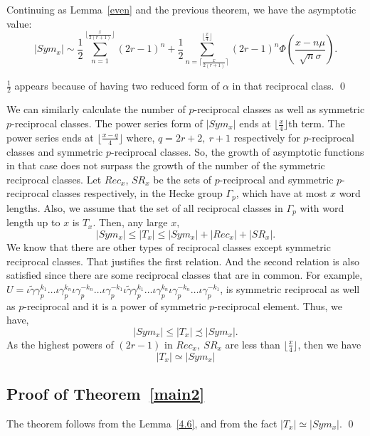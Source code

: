 \documentclass[11pt]{amsart}
\renewenvironment{proof}{{\bfseries Proof.}}{\qed}
\numberwithin{equation}{section}
\newcommand{\gt}{\tilde{\gamma}}
\newcommand{\g}{\gamma_{p}}
\newcommand{\io}{\iota }
\newcommand{\thmref}[1]{Theorem~\ref{#1}}
\newcommand{\lemref}[1]{Lemma~\ref{#1}}
\numberwithin{equation}{section}
\begin{document}
\begin{proof}
			Continuing as \lemref{even} and the previous theorem, we have the asymptotic value: 
				\[\left|Sym_{x}\right|\sim 	\frac{1}{2}\sum_{n=1}^{\lfloor \frac{x}{2(r+1)}\rfloor}(2r-1)^{n}+\frac{1}{2}{\sum_{n=\lceil \frac{x}{2(r+1)}\rceil}^{\lfloor\frac{x}{4}\rfloor}(2r-1)^{n}\Phi\left(\frac{x-n\mu}{\sqrt{n}\sigma}\right)}. \]
				
				
				$ \frac{1}{2}$ appears because of having two reduced form of $\alpha$ in that reciprocal class.
		\end{proof}
		
		\medspace
		
		 We can similarly calculate the number of $ p$-reciprocal classes as well as symmetric $p $-reciprocal classes. The power series form of $|Sym_{x}|$  ends at $\lfloor\frac{x}{4}\rfloor$th term. The power series ends at $\lfloor\frac{x-q}{4}\rfloor$ where, $q=2r+2,~r+1$ respectively for $p$-reciprocal classes and symmetric $p$-reciprocal classes. So, the growth of asymptotic functions in that case does not surpass  the growth of the number of the symmetric reciprocal classes. Let $Rec_{x}$, $SR_{x}$ be the sets of $p$-reciprocal and symmetric $p$-reciprocal classes respectively, in the Hecke group $\Gamma_{p}$, which have at most $x$ word lengths. Also, we assume that the set of all reciprocal classes in 
        $\Gamma_p$ with word length up to $x$ is $T_{x}$.
		 Then, any large $x,$ \[|Sym_{x}|\leq |T_{x}|\leq |Sym_{x}|+|Rec_{x}|+|SR_{x}|.\]
		 We know that there are other types of reciprocal classes except symmetric reciprocal classes. That justifies the first relation. And the second relation is also satisfied since there are some reciprocal classes that are in common. For example, $U=\io\gt\g^{k_{1}}\dots \io \g^{k_{n}}\io \g^{-k_{n}}\dots\io \g^{-k_{1}} \io\gt\g^{k_{1}}\dots \io \g^{k_{n}}\io \g^{-k_{n}}\dots\io \g^{-k_{1}}$, is symmetric reciprocal as well as $p$-reciprocal and it is a power of symmetric $p $-reciprocal element. Thus, we have,
		 \[|Sym_x|\leq |{T_{x}}|\precsim |Sym_x|.\]
		 As the highest powers of $(2r-1)$ in $Rec_{x},~SR_{x}$ are less than $\lfloor\frac{x}{4}\rfloor$, then we have 
          \[ |T_x|\simeq |Sym_x|\]
	
		\subsection{Proof of \thmref{main2}}
		
		
			The theorem follows from the \lemref{4.6}, and from the fact $ |{T_{x}}|\simeq{|Sym_{x}|}.$ \qed
\end{document}
